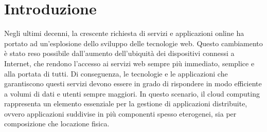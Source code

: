 \chapter*{Introduzione}
Negli ultimi decenni, la crescente richiesta di servizi e applicazioni online ha portato ad un'esplosione dello sviluppo
delle tecnologie web. Questo cambiamento è stato reso possibile dall'aumento dell'ubiquità dei dispositivi connessi a
Internet, che rendono l'accesso ai servizi web sempre più immediato, semplice e alla portata di tutti. Di conseguenza,
le tecnologie e le applicazioni che garantiscono questi servizi devono essere in grado di rispondere in modo efficiente
a volumi di dati e utenti sempre maggiori. In questo scenario, il cloud computing rappresenta un elemento essenziale per
la gestione di applicazioni distribuite, ovvero applicazioni suddivise in più componenti spesso eterogenei, sia per
composizione che locazione fisica. 

